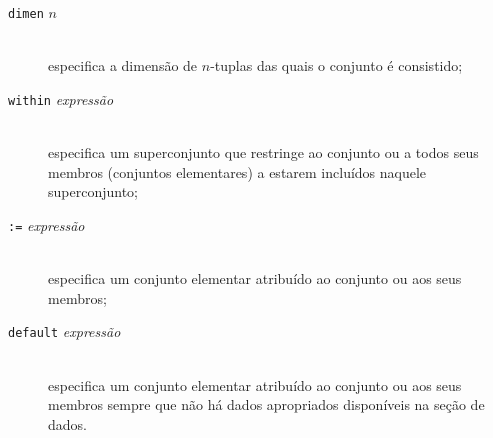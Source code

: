 \documentclass[11pt, brazil]{report}
\begin{document}
\vspace*{-8pt}

\begin{description}
\item[{\tt dimen} $n$]\hspace*{0pt}\\
especifica a dimensão de $n$-tuplas das quais o conjunto é consistido;
\item[{\tt within} {\it expressão}]\hspace*{0pt}\\
especifica um superconjunto que restringe ao conjunto ou a todos seus
membros (conjuntos elementares) a estarem incluídos naquele superconjunto;
\item[{\tt:=} {\it expressão}]\hspace*{0pt}\\
especifica um conjunto elementar atribuído ao conjunto ou aos seus membros;
\item[{\tt default} {\it expressão}]\hspace*{0pt}\\
especifica um conjunto elementar atribuído ao conjunto ou aos seus membros
sempre que não há dados apropriados disponíveis na seção de dados.
\end{description}


\vspace*{-8pt}
\end{document}
